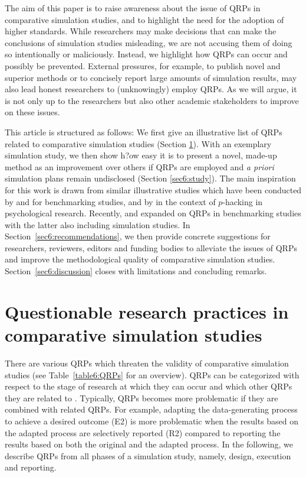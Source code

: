 The aim of this paper is to raise awareness about the issue of QRPs in
comparative simulation studies, and to highlight the need for the adoption of
higher standards. While researchers may make decisions that can make the
conclusions of simulation studies misleading, we are not accusing them of doing
so intentionally or maliciously. Instead, we highlight how QRPs can occur and
possibly be prevented. External pressures, for example, to publish novel and
superior methods \citep{Boulesteix2015} or to concisely report large amounts of
simulation results, may also lead honest researchers to (unknowingly) employ
QRPs. As we will argue, it is not only up to the researchers but also other
academic stakeholders to improve on these issues.

This article is structured as follows: We first give an illustrative list of
QRPs related to comparative simulation studies (Section \ref{sec6:QRP}). With an
exemplary simulation study, we then show h?ow easy it is to present a novel,
made-up method as an improvement over others if QRPs are employed and \emph{a
  priori} simulation plans remain undisclosed (Section \ref{sec6:study}). The
main inspiration for this work is drawn from similar illustrative studies which
have been conducted by \citet{Yousefi2009} and \citet{Jelizarow2010} for
benchmarking studies, and by \citet{Simmons2011} in the context of $p$-hacking
in psychological research. Recently, \citet{Niessl2021} and \citet{Ullmann2022}
expanded on QRPs in benchmarking studies with the latter also including
simulation studies. In Section~\ref{sec6:recommendations}, we then provide
concrete suggestions for researchers, reviewers, editors and funding bodies to
alleviate the issues of QRPs and improve the methodological quality of
comparative simulation studies. Section~\ref{sec6:discussion} closes with
limitations and concluding remarks.


\section{Questionable research practices in comparative simulation studies}
\label{sec6:QRP}

There are various QRPs which threaten the validity of comparative simulation
studies (see Table~\ref{table6:QRPs} for an overview). QRPs can be categorized
with respect to the stage of research at which they can occur and which other
QRPs they are related to \citep{Wicherts2016}. Typically, QRPs becomes more
problematic if they are combined with related QRPs. For example, adapting the
data-generating process to achieve a desired outcome (E2) is more problematic
when the results based on the adapted process are selectively reported (R2)
compared to reporting the results based on both the original and the adapted
process. In the following, we describe QRPs from all phases of a simulation
study, namely, design, execution and reporting.

